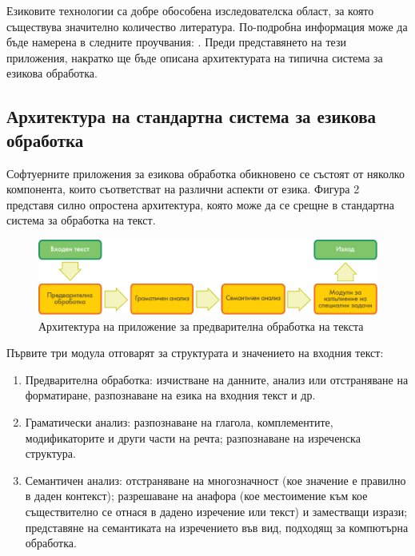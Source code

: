 \documentclass[]{../../metanetpaper}
\begin{document}
\begin{multicols}{2}
Езиковите технологии са добре обособена изследователска област, за която съществува значително количество литература. По-подробна информация може да бъде намерена в следните проучвания:  \cite{jurafsky-martin01, manning-schuetze1, lt-world1, lt-survey1}.
Преди представянето на тези приложения, накратко ще бъде описана  архитектурата на типична система за езикова обработка.

\subsection{Архитектура на стандартна система за езикова обработка}

Софтуерните приложения за езикова обработка обикновено се състоят от няколко компонента, които съответстват на различни аспекти от езика. Фигура 2 представя силно опростена архитектура, която може да се срещне в стандартна система за обработка на текст. 

\begin{figure}[b]
  \center
  \includegraphics[width=\textwidth]{../_media/bulgarian/text_processing_app_architecture}
  \caption{Архитектура на приложение за предварителна обработка на текста}
  \label{fig:textprocessingarch_de}
\end{figure}

Първите три модула отговарят за структурата и значението на входния
текст:

\begin{enumerate}
\item Предварителна обработка: изчистване на данните, анализ или отстраняване на форматиране, разпознаване на езика на входния текст и др. 
\item Граматически анализ: разпознаване на глагола, комплементите, модификаторите и други части на речта; разпознаване на изреченска структура. 
\item Семантичен анализ: отстраняване на многозначност (кое значение е правилно в даден контекст); разрешаване на анафора (кое местоимение към кое съществително се отнася в дадено изречение или текст) и заместващи изрази; представяне на семантиката на изречението във вид, подходящ за компютърна обработка. 
\end{enumerate}


\end{multicols}
\end{document}
